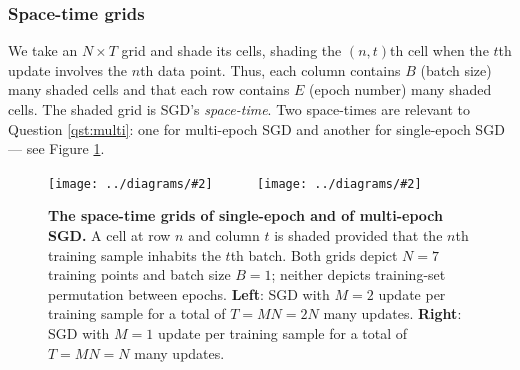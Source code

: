 \documentclass[final,12pt]{colt2021} %
\newcommand{\dmoo}[2]{\texttt{[image: ../diagrams/\#2]}}
\begin{document}
        \subsubsection{Space-time grids}
            We take an $N\times T$ grid and shade its cells, shading the
            $(n,t)$th cell when the $t$th update involves the $n$th data point.
            Thus, each column contains $B$ (batch size) many shaded cells and
            that each row contains $E$ (epoch number) many shaded cells.
            The shaded grid is SGD's \emph{space-time}.
            Two space-times are relevant to Question \ref{qst:multi}: one for
            multi-epoch SGD and another for single-epoch SGD --- see Figure
            \ref{fig:spacetimes-epoch}.
            \begin{figure}[h!] 
                \centering
                \dmoo{3.55cm}{spacetime-b1-e2-nosh}
                ~~~~~
                \dmoo{3.55cm}{spacetime-b1-e1-nosh}
                \caption{
                    \textbf{The space-time grids of single-epoch and of
                    multi-epoch SGD.}  A cell at row $n$ and column $t$ is
                    shaded provided that the $n$th training sample inhabits the
                    $t$th batch.  Both grids depict $N=7$
                    training points and batch size $B=1$; neither
                    depicts training-set permutation between epochs.
                    \newline
                    \textbf{Left}:
                        SGD with $M=2$ update per training sample for a total
                        of $T = MN = 2N$ many updates.
                    \newline
                    \textbf{Right}:
                        SGD with $M=1$ update per training sample for a total
                        of $T = MN = N$ many updates.
                }
                \label{fig:spacetimes-epoch}
            \end{figure}

        \newpage
\end{document}
